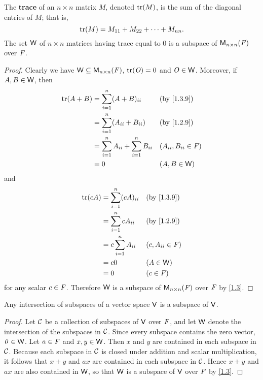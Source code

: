\begin{eg}\label{1.3.9}
  The \textbf{trace} of an \(n \times n\) matrix \(M\), denoted \(\tr{M}\), is the sum of the diagonal entries of \(M\);
  that is,
  \[
    \tr{M} = M_{1 1} + M_{2 2} + \dots + M_{n n}.
  \]
  The set \(\mathsf{W}\) of \(n \times n\) matrices having trace equal to \(0\) is a subspace of \(\mathsf{M}_{{n} \times n}({\mathit{F}})\) over \(\mathit{F}\).
\end{eg}

\begin{proof}
  Clearly we have \(\mathsf{W} \subseteq \mathsf{M}_{{n} \times n}({\mathit{F}})\), \(\tr{\zm} = 0\) and \(\mathit{O} \in \mathsf{W}\).
  Moreover, if \(A, B \in \mathsf{W}\), then
  \begin{align*}
    \tr{A + B} & = \sum_{i = 1}^n (A + B)_{i i}                    &  & \text{(by \cref{1.3.9})}  \\
               & = \sum_{i = 1}^n (A_{i i} + B_{i i})              &  & \text{(by \cref{1.2.9})}  \\
               & = \sum_{i = 1}^n A_{i i} + \sum_{i = 1}^n B_{i i} &  & (A_{i i}, B_{i i} \in \F) \\
               & = 0                                               &  & (A, B \in \W)
  \end{align*}
  and
  \begin{align*}
    \tr{cA} & = \sum_{i = 1}^n (cA)_{i i} &  & \text{(by \cref{1.3.9})} \\
            & = \sum_{i = 1}^n cA_{i i}   &  & \text{(by \cref{1.2.9})} \\
            & = c \sum_{i = 1}^n A_{i i}  &  & (c, A_{i i} \in \F)      \\
            & = c0                        &  & (A \in \W)               \\
            & = 0                         &  & (c \in \F)
  \end{align*}
  for any scalar \(c \in \mathit{F}\).
  Therefore \(\mathsf{W}\) is a subspace of \(\mathsf{M}_{{n} \times n}({\mathit{F}})\) over \(\mathit{F}\) by \cref{1.3}.
\end{proof}

\begin{thm}\label{1.4}
  Any intersection of subspaces of a vector space \(\mathsf{V}\) is a subspace of \(\mathsf{V}\).
\end{thm}

\begin{proof}
  Let \(\mathcal{C}\) be a collection of subspaces of \(\mathsf{V}\) over \(\mathit{F}\), and let \(\mathsf{W}\) denote the intersection of the subspaces in \(\mathcal{C}\).
  Since every subspace contains the zero vector, \(\mathit{0} \in \mathsf{W}\).
  Let \(a \in \mathit{F}\) and \(x, y \in \mathsf{W}\).
  Then \(x\) and \(y\) are contained in each subspace in \(\mathcal{C}\).
  Because each subspace in \(\mathcal{C}\) is closed under addition and scalar multiplication, it follows that \(x + y\) and \(ax\) are contained in each subspace in \(\mathcal{C}\).
  Hence \(x + y\) and \(ax\) are also contained in \(\mathsf{W}\), so that \(\mathsf{W}\) is a subspace of \(\mathsf{V}\) over \(\mathit{F}\) by \cref{1.3}.
\end{proof}

